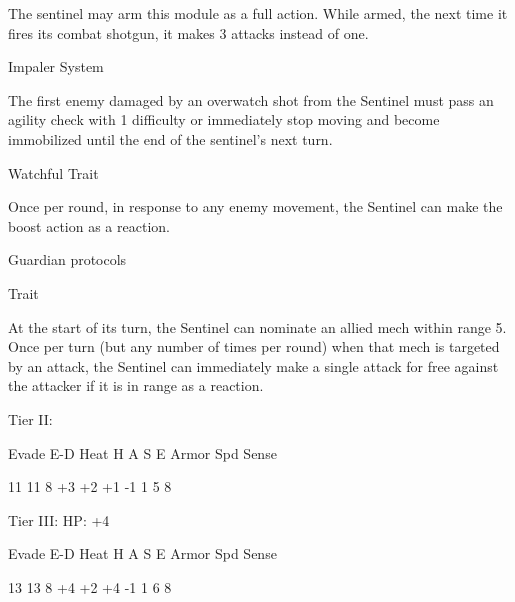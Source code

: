 The sentinel may arm this module as a full action. While armed, the next time it fires its combat
shotgun, it makes 3 attacks instead of one.


Impaler
System

The first enemy damaged by an overwatch shot from the Sentinel must pass an agility check
with 1 difficulty or immediately stop moving and become immobilized until the end of the
sentinel’s next turn.


Watchful
Trait

Once per round, in response to any enemy movement, the Sentinel can make the boost action as
a reaction.


Guardian protocols

Trait

At the start of its turn, the Sentinel can nominate an allied mech within range 5. Once per turn
(but any number of times per round) when that mech is targeted by an attack, the Sentinel can
immediately make a single attack for free against the attacker if it is in range as a reaction.


Tier II:


          Evade     E-D    Heat    H    A     S     E        Armor        Spd      Sense

          11        11     8       +3    +2   +1    -1       1            5        8

Tier III:
HP: +4


          Evade     E-D    Heat    H    A     S     E        Armor        Spd      Sense

          13        13     8       +4    +2   +4    -1       1            6        8
